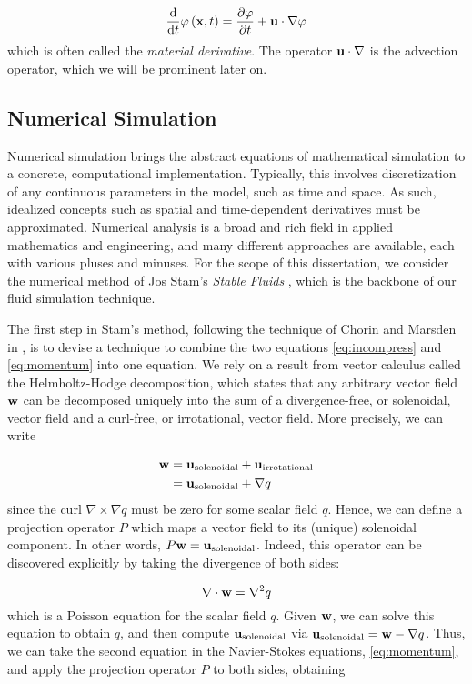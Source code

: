 \begin{equation}
\frac{\mathrm{d}}{\mathrm{d}t}\varphi\left(\mathbf{x}, t\right) = \frac{\partial \varphi}{\partial t} + \mathbf{u} \cdot \nabla \varphi
\end{equation}
which is often called the {\em material derivative}. The operator $\mathbf{u} \cdot \nabla$ is the advection operator, which we will be prominent later on.

\subsection{Numerical Simulation}
Numerical simulation brings the abstract equations of mathematical simulation to a concrete, computational implementation. Typically, this involves discretization of any continuous parameters in the model, such as time and 
space. As such, idealized concepts such as spatial and time-dependent derivatives must be approximated. Numerical analysis is a broad and rich field in applied mathematics and engineering, and many different approaches
are available, each with various pluses and minuses. For the scope of this dissertation, we consider the numerical method of Jos Stam's {\em Stable Fluids} \cite{Stam99}, which is the backbone of our fluid simulation technique. 

The first step in Stam's method, following the technique of Chorin and Marsden in \cite{chorin1990mathematical}, is to devise a technique to combine the two equations \ref{eq:incompress} and \ref{eq:momentum} into one equation. We rely on a result from vector calculus called the Helmholtz-Hodge decomposition, which states that any arbitrary vector field $\mathbf{w}$ can be decomposed uniquely into the sum of a divergence-free, or solenoidal, vector field and a curl-free, or irrotational, vector field. More precisely,
we can write

\begin{align}
\label{eq:hh}
\mathbf{w} &= \mathbf{u}_{\text{solenoidal}} + \mathbf{u}_{\text{irrotational}}\\
        &= \mathbf{u}_{\text{solenoidal}} + \nabla q
\end{align}
since the curl $\nabla \times \nabla q$ must be zero for some scalar field $q$. Hence, we can define a projection operator $P$ which maps a vector field to its (unique) solenoidal component. In other words,
$P \mathbf{w} = \mathbf{u}_{\text{solenoidal}}$. Indeed, this operator can be discovered explicitly by taking the divergence of both sides:

\begin{equation}
\nabla \cdot \mathbf{w} = \nabla^2 q
\end{equation}
which is a Poisson equation for the scalar field $q$. Given $\mathbf{w}$, we can solve this equation to obtain $q$, and then compute $\mathbf{u}_{\text{solenoidal}}$ via $\mathbf{u}_{\text{solenoidal}} = \mathbf{w} - \nabla q$. Thus, we can take the
second equation in the Navier-Stokes equations, \ref{eq:momentum}, and apply the projection operator $P$ to both sides, obtaining

